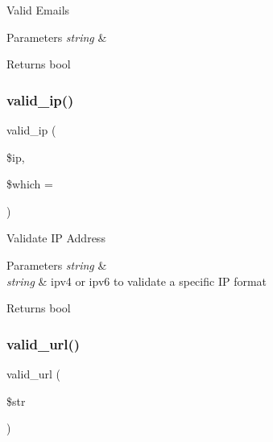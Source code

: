 Valid Emails


\begin{DoxyParams}{Parameters}
{\em string} & \\
\hline
\end{DoxyParams}
\begin{DoxyReturn}{Returns}
bool 
\end{DoxyReturn}
\mbox{\label{class_c_i___form__validation_a10da42e1fde6cd5b335efcd2338c4ff8}} 
\subsubsection{\texorpdfstring{valid\+\_\+ip()}{valid\_ip()}}
{\footnotesize\ttfamily valid\+\_\+ip (\begin{DoxyParamCaption}\item[{}]{\$ip,  }\item[{}]{\$which = {\ttfamily \textquotesingle{}\textquotesingle{}} }\end{DoxyParamCaption})}

Validate IP Address


\begin{DoxyParams}{Parameters}
{\em string} & \\
\hline
{\em string} & \textquotesingle{}ipv4\textquotesingle{} or \textquotesingle{}ipv6\textquotesingle{} to validate a specific IP format \\
\hline
\end{DoxyParams}
\begin{DoxyReturn}{Returns}
bool 
\end{DoxyReturn}
\mbox{\label{class_c_i___form__validation_a2879cd05a763105684cbad690e5cffd3}} 
\subsubsection{\texorpdfstring{valid\+\_\+url()}{valid\_url()}}
{\footnotesize\ttfamily valid\+\_\+url (\begin{DoxyParamCaption}\item[{}]{\$str }\end{DoxyParamCaption})}

